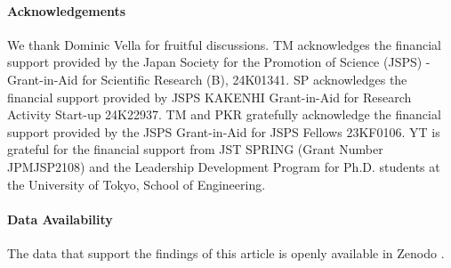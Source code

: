 \documentclass[twocolumn, prl,
 amsmath,amssymb,
 superscriptaddress,aps,
]{revtex4-2}
\begin{document}
\begin{acknowledgments}
\paragraph*{Acknowledgements}
We thank Dominic Vella for fruitful discussions. 
TM acknowledges the financial support provided by the Japan Society for the Promotion of Science (JSPS) - Grant-in-Aid for Scientific Research (B), 24K01341. SP acknowledges the financial support provided by JSPS KAKENHI Grant-in-Aid for Research Activity Start-up 24K22937. TM and PKR gratefully acknowledge the financial support provided by the JSPS Grant-in-Aid for JSPS Fellows 23KF0106. YT is grateful for the financial support from JST SPRING (Grant Number JPMJSP2108) and the Leadership Development Program for Ph.D. students at the University of Tokyo, School of Engineering.
\end{acknowledgments}

\paragraph*{Data Availability}
The data that support the findings of this article is openly available in Zenodo
\cite{dataset}.



%
%
\end{document}
